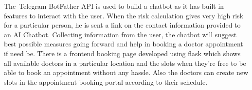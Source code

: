 \documentclass[12pt]{article}
\begin{document}
\vspace{\baselineskip}
\setlength{\parskip}{9.96pt}
\setlength{\parskip}{0.0pt}
\begin{justify}
The\ Telegram BotFather API is used to build a chatbot as it has built in features to interact with the user. When the risk calculation gives very high risk for a particular person, he is sent a link on the contact information provided to an AI Chatbot. Collecting information from the user, the chatbot will suggest best possible measures going forward and help in booking a doctor appointment if need be. There is a frontend booking page developed using flask  which shows all available doctors in a particular location and the slots when they’re free to be able to book an appointment without any hassle. Also the doctors can create new slots in the appointment booking portal according to their schedule.
\end{justify}

\vspace{\baselineskip}
\setlength{\parskip}{9.96pt}

\vspace{\baselineskip}

\vspace{\baselineskip}

\vspace{\baselineskip}
\vspace{\baselineskip}
\vspace{\baselineskip}
\vspace{\baselineskip}
\vspace{\baselineskip}
\vspace{\baselineskip}
\vspace{\baselineskip}
\vspace{\baselineskip}
\vspace{\baselineskip}
\vspace{\baselineskip}
\vspace{\baselineskip}
\vspace{\baselineskip}
\end{document}
